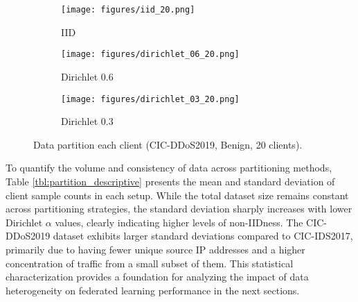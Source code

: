\begin{figure}[h]
    \centering

    \begin{subfigure}[b]{0.32\textwidth}
        \centering
        \texttt{[image: figures/iid\_20.png]}
        \caption{IID}
    \end{subfigure}
    \hfill
    \begin{subfigure}[b]{0.32\textwidth}
        \centering
        \texttt{[image: figures/dirichlet\_06\_20.png]}
        \caption{Dirichlet 0.6}
    \end{subfigure}
    \hfill
    \begin{subfigure}[b]{0.32\textwidth}
        \centering
        \texttt{[image: figures/dirichlet\_03\_20.png]}
        \caption{Dirichlet 0.3}
    \end{subfigure}

    \caption{Data partition each client (CIC-DDoS2019, Benign, 20 clients).}
    \label{fig:partition_distributions}
\end{figure}


To quantify the volume and consistency of data across partitioning methods, Table \ref{tbl:partition_descriptive} presents the mean and standard deviation of client sample counts in each setup. While the total dataset size remains constant across partitioning strategies, the standard deviation sharply increases with lower Dirichlet $\alpha$ values, clearly indicating higher levels of non-IIDness. The CIC-DDoS2019 dataset exhibits larger standard deviations compared to CIC-IDS2017, primarily due to having fewer unique source IP addresses and a higher concentration of traffic from a small subset of them. This statistical characterization provides a foundation for analyzing the impact of data heterogeneity on federated learning performance in the next sections.

